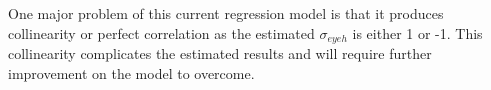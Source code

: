 \documentclass[fleqn]{article}
\begin{document}
\begin{outline}[enumerate]
%

\clearpage

One major problem of this current regression model is that it produces collinearity or perfect correlation as the estimated $\sigma_{eyeh}$ is either 1 or -1. This collinearity complicates the estimated results and will require further improvement on the model to overcome.


\end{outline}
\end{document}
